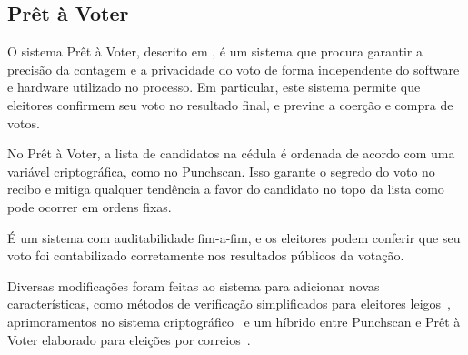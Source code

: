 \subsection{Prêt à Voter}

O sistema Prêt à Voter, descrito em \textcite{ryan2009pret}, é um sistema que
procura garantir a precisão da contagem e a privacidade do voto de forma
independente do software e hardware utilizado no processo. Em particular, este
sistema permite que eleitores confirmem seu voto no resultado final, e previne
a coerção e compra de votos.

No Prêt à Voter, a lista de candidatos na cédula é ordenada de acordo com uma
variável criptográfica, como no Punchscan. Isso garante o segredo do voto no
recibo e mitiga qualquer tendência a favor do candidato no topo da lista como
pode ocorrer em ordens fixas.

É um sistema com auditabilidade fim-a-fim, e os eleitores podem conferir que
seu voto foi contabilizado corretamente nos resultados públicos da votação.

Diversas modificações foram feitas ao sistema para adicionar novas
características, como métodos de verificação simplificados para eleitores
leigos~\cite{lundin2008human}, aprimoramentos no sistema
criptográfico~\cite{ryan2006pret} e um híbrido entre Punchscan e Prêt à Voter
elaborado para eleições por correios~\cite{popoveniuc2007simple}.
